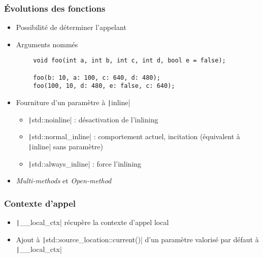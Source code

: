 \documentclass[C++.tex]{subfiles}
\begin{document}
\begin{frame}[fragile]
	\frametitle{Évolutions des fonctions}
	\begin{itemize}
		\item Possibilité de déterminer l'appelant
		\item Arguments nommés
	\end{itemize}

	\begin{verbatim}
		void foo(int a, int b, int c, int d, bool e = false);

		foo(b: 10, a: 100, c: 640, d: 480);
		foo(100, 10, d: 480, e: false, c: 640);
	\end{verbatim}

	\begin{itemize}
		\item Fourniture d'un paramètre à \texttt|inline|
		\begin{itemize}
			\item \texttt|std::noinline| : désactivation de l'inlining
			\item \texttt|std::normal_inline| : comportement actuel, incitation (équivalent à \texttt|inline| sans paramètre)
			\item \texttt|std::always_inline| : force l'inlining
		\end{itemize}
		\item \textit{Multi-methods} et \textit{Open-method}
	\end{itemize}

\end{frame}

\begin{frame}[fragile]
	\frametitle{Contexte d'appel}
	\begin{itemize}
		\item \texttt|__local_ctx| récupère la contexte d'appel local
		\item Ajout à \texttt|std::source_location::current()| d'un paramètre valorisé par défaut à \texttt|__local_ctx|


	\end{itemize}

\end{frame}
\end{document}
